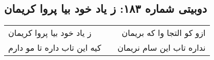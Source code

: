 \begin{center}
\section*{دوبیتی شماره ۱۸۳: ز یاد خود بیا پروا کریمان}
\label{sec:183}
\begin{longtable}{l p{0.5cm} r}
ز یاد خود بیا پروا کریمان
&&
ازو کو التجا وا که بریمان
\\
کیه این تاب داره تا مو دارم
&&
نداره تاب این سام نریمان
\\
\end{longtable}
\end{center}
